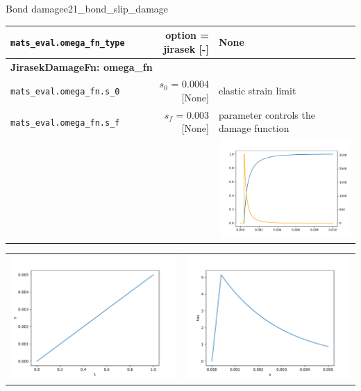\documentclass[main.tex]{subfiles}
\begin{document}
\begin{bmcsex}{Bond damage}{e21_bond_slip_damage}
\begin{center}
{\begin{longtable}{lrp{4cm}}
\texttt{mats\_eval.omega\_fn\_type} & option = jirasek [-] & {\footnotesize None}  \\
            \midrule
\multicolumn{3}{l}{\textbf{\textsf{JirasekDamageFn: omega\_fn}}}\\

\texttt{mats\_eval.omega\_fn.s\_0} & $s_0$ = 0.0004 [None] & {\footnotesize elastic strain limit}  \\
            \texttt{mats\_eval.omega\_fn.s\_f} & $s_f$ = 0.003 [None] & {\footnotesize parameter controls the damage function}  \\
            
\multicolumn{3}{r}{\includegraphics[width=5cm]{examples/e21_bond_slip_damage/fig_Jirasek_damage_function.pdf}}\\
\bottomrule 
\end{longtable}
}

\noindent
\begin{longtable}{L{7.5cm}L{7.5cm}}
\includegraphics[width=7.5cm]{examples/e21_bond_slip_damage/fig_s-t.pdf}
 & 
\includegraphics[width=7.5cm]{examples/e21_bond_slip_damage/fig_tau-s.pdf}
 \\\end{longtable}


\end{center}
\end{bmcsex}
\end{document}
